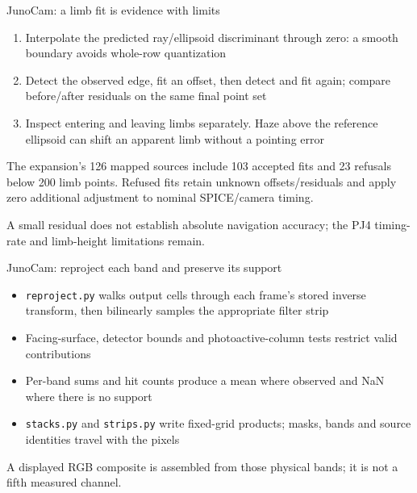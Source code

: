 \documentclass[aspectratio=169,11pt]{beamer}
\newcommand{\currevsec}{}
\newcommand{\revsec}[1]{\gdef\currevsec{#1}}
\begin{document}
\begin{frame}{JunoCam: a limb fit is evidence with limits}
  \revsec{4.18}
\begin{enumerate}
    \item Interpolate the predicted ray/ellipsoid discriminant through zero: a smooth boundary avoids whole-row quantization
    \item Detect the observed edge, fit an offset, then detect and fit again; compare before/after residuals on the same final point set
    \item Inspect entering and leaving limbs separately. Haze above the reference ellipsoid can shift an apparent limb without a pointing error
  \end{enumerate}
  \vspace{0.2cm}
  The expansion's 126 mapped sources include 103 accepted fits and 23 refusals below 200 limb points. Refused fits retain unknown offsets/residuals and apply zero additional adjustment to nominal SPICE/camera timing.
  \vspace{0.2cm}

  A small residual does not establish absolute navigation accuracy; the PJ4 timing-rate and limb-height limitations remain.
\end{frame}

\begin{frame}{JunoCam: reproject each band and preserve its support}
  \revsec{4.18}
\begin{itemize}
    \item \texttt{reproject.py} walks output cells through each frame's stored inverse transform, then bilinearly samples the appropriate filter strip
    \item Facing-surface, detector bounds and photoactive-column tests restrict valid contributions
    \item Per-band sums and hit counts produce a mean where observed and NaN where there is no support
    \item \texttt{stacks.py} and \texttt{strips.py} write fixed-grid products; masks, bands and source identities travel with the pixels
  \end{itemize}
  A displayed RGB composite is assembled from those physical bands; it is not a fifth measured channel.
\end{frame}
\end{document}
